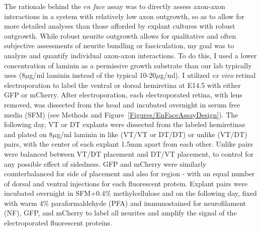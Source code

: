 \label{sec:EnFace}
The rationale behind the \emph{en face} assay was to directly assess axon-axon interactions in a system with relatively low axon outgrowth, so as to allow for more detailed analyses than those afforded by explant cultures with robust outgrowth.
While robust neurite outgrowth allows for qualitative and often subjective assessments of neurite bundling or fasciculation, my goal was to analyze and quantify individual axon-axon interactions.
To do this, I used a lower concentration of laminin as a permissive growth substrate than our lab typically uses (8$\mu$g/ml laminin instead of the typical 10-20$\mu$g/ml).
I utilized \emph{ex vivo} retinal electroporation \cite{petros2009utero} to label the ventral or dorsal hemiretina at E14.5 with either GFP or mCherry.
After electroporation, each electroporated retina, with lens removed, was dissected from the head and incubated overnight in serum free media (SFM) (see Methods and Figure~\ref{Figures/EnFaceAssayDesign}).
The following day, VT or DT explants were dissected from the labeled hemiretinae and plated on 8$\mu$g/ml laminin in like (VT/VT or DT/DT) or unlike (VT/DT) pairs, with the center of each explant 1.5mm apart from each other.
Unlike pairs were balanced between VT/DT placement and DT/VT placement, to control for any possible effect of sidedness.
GFP and mCherry were similarly counterbalanced for side of placement and also for region - with an equal number of dorsal and ventral injections for each fluorescent protein.
Explant pairs were incubated overnight in SFM+0.4\% methylcellulose and on the following day, fixed with warm 4\% paraformaldehyde (PFA) and immunostained for neurofilament (NF), GFP, and mCherry to label all neurites and amplify the signal of the electroporated fluorescent proteins.

